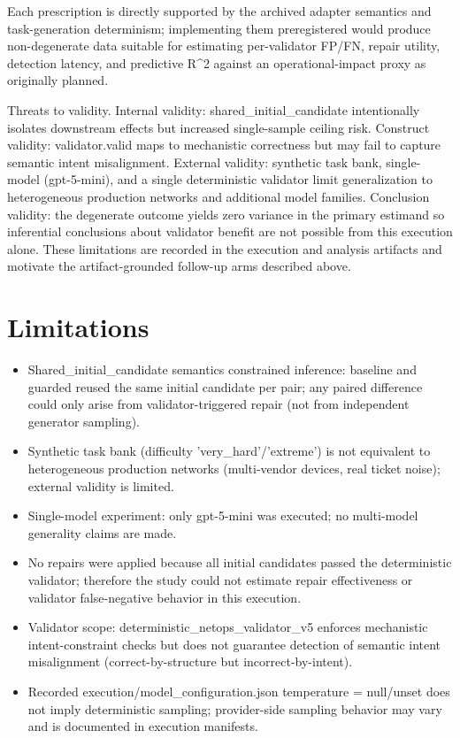 \documentclass[conference]{IEEEtran}
\begin{document}
Each prescription is directly supported by the archived adapter semantics and task-generation determinism; implementing them preregistered would produce non-degenerate data suitable for estimating per-validator FP/FN, repair utility, detection latency, and predictive R\textasciicircum{}2 against an operational-impact proxy as originally planned.

Threats to validity. Internal validity: shared\_initial\_candidate intentionally isolates downstream effects but increased single-sample ceiling risk. Construct validity: validator.valid maps to mechanistic correctness but may fail to capture semantic intent misalignment. External validity: synthetic task bank, single-model (gpt-5-mini), and a single deterministic validator limit generalization to heterogeneous production networks and additional model families. Conclusion validity: the degenerate outcome yields zero variance in the primary estimand so inferential conclusions about validator benefit are not possible from this execution alone. These limitations are recorded in the execution and analysis artifacts and motivate the artifact-grounded follow-up arms described above.

\section{Limitations}
\begin{itemize}
\item Shared\_initial\_candidate semantics constrained inference: baseline and guarded reused the same initial candidate per pair; any paired difference could only arise from validator-triggered repair (not from independent generator sampling).
\item Synthetic task bank (difficulty 'very\_hard'/'extreme') is not equivalent to heterogeneous production networks (multi-vendor devices, real ticket noise); external validity is limited.
\item Single-model experiment: only gpt-5-mini was executed; no multi-model generality claims are made.
\item No repairs were applied because all initial candidates passed the deterministic validator; therefore the study could not estimate repair effectiveness or validator false-negative behavior in this execution.
\item Validator scope: deterministic\_netops\_validator\_v5 enforces mechanistic intent-constraint checks but does not guarantee detection of semantic intent misalignment (correct-by-structure but incorrect-by-intent).
\item Recorded execution/model\_configuration.json temperature = null/unset does not imply deterministic sampling; provider-side sampling behavior may vary and is documented in execution manifests.
\end{itemize}
\end{document}
